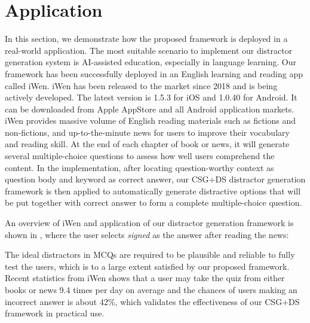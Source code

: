 \section{Application}
In this section, we demonstrate how the proposed framework is deployed in a real-world application. The  most suitable scenario to implement our distractor generation system is AI-assisted education, especially in language learning. Our framework has been successfully deployed in an English learning and reading app called iWen. iWen has been released to the market since 2018 and is being actively developed. The latest version is 1.5.3 for iOS and 1.0.40 for Android. It can be downloaded from Apple AppStore and 
all Android application markets. iWen provides massive volume of English reading materials 
such as fictions and non-fictions, and up-to-the-minute news for users to improve their 
vocabulary and reading skill. At the end of each chapter of book or news, it will generate 
several multiple-choice questions to assess how well users comprehend the content. 
In the implementation, after locating question-worthy context as question body and keyword as 
correct answer, our CSG+DS distractor generation framework is then applied to 
automatically generate distractive options that will be put together with correct answer 
to form a complete multiple-choice question.

An overview of iWen and application of our 
distractor generation framework is shown in , where the user 
selects \textit{signed} as the answer after reading the news:

The ideal distractors in MCQs are required to be plausible and reliable to fully test 
the users, which is to a large extent satisfied by our proposed framework. Recent statistics from iWen shows that a user may take the quiz from either books or news 9.4 times per day on average and the chances of users making an incorrect
answer is about 42\%, which validates the effectiveness of our CSG+DS 
framework in practical use.
